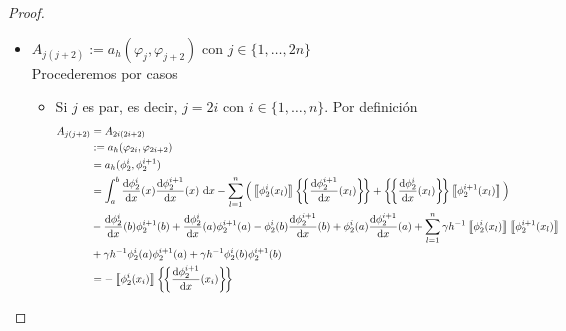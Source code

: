 \documentclass[10pt,a4paper]{report}
\newcommand{\dx}{\textup{d}x}
\providecommand{\Dx}[1]{\frac{\textup{d} #1}{\textup{d}x}}
\providecommand{\salto}[1]{\left\llbracket#1\right\rrbracket}
\providecommand{\prom}[1]{\left \{\!\left \{#1\right \}\!\right \}}
\begin{document}
\begin{proof}
\begin{itemize}
\begin{itemize}
\begin{align*}
            		           &-\Dx{\phi^{i}_{1}}(b)\phi^{i}_{2}(b) + \Dx{\phi^{i}_{1}}(a)\phi^{i}_{2}(a) - \phi^{i}_{1}(b)\Dx{\phi^{i}_{2}}(b) + \phi^{i}_{1}(a)\Dx{\phi^{i}_{2}}(a) + \sum_{l=1}^{n}\gamma h^{-1}\salto{\phi^{i}_{1}(x_{l})}\salto{\phi^{i}_{2}(x_{l})}\\
            		           &+ \gamma h^{-1}\phi^{i}_{1}(a)\phi^{i}_{2}(a) + \gamma h^{-1}\phi^{i}_{1}(b)\phi^{i}_{2}(b)\\
            		           &= \int_{x_{i-1}}^{x_{i}}-\frac{1}{h^{2}}\ \dx - \prom{\Dx{\phi^{i}_{1}}(x_{i})}\salto{\phi^{i}_{2}(x_{i})} - \salto{\phi^{i}_{1}(x_{i-1})}\prom{\Dx{\phi^{i}_{2}}(x_{i-1})}\\
            		           &= -\frac{1}{h} + \frac{1}{2h} + \frac{1}{2h}\\
            		           &= 0
            	\end{align*}
            \end{itemize}
            \item  $A_{j(j+2)} := a_{h}\left( \varphi_{j},\varphi_{j+2}\right)$ con $j\in\{1,\dots,2n\}$\\
            Procederemos por casos
            \begin{itemize}
            	\item Si $j$ es par, es decir, $j = 2i$ con $i\in\{1,\dots,n\}$. Por definición
            	\begin{align*}
            		A_{j(j+2)} &= A_{2i (2i+2)}\\ 
            		           &:= a_{h}(\varphi_{2i},\varphi_{2i+2})\\ 
            		           &= a_{h}(\phi^{i}_{2},\phi^{i+1}_{2})\\
            		           &= \int_{a}^{b} \Dx{\phi^{i}_{2}}(x)\Dx{\phi^{i+1}_{2}}(x)\ \dx - \sum_{l=1}^{n}\Big(\salto{\phi^{i}_{2}(x_{l})}\prom{\Dx{\phi^{i+1}_{2}}(x_{l})} + \prom{\Dx{\phi^{i}_{2}}(x_{l})}\salto{\phi^{i+1}_{2}(x_{l})}\Big)\\
            		           &-\Dx{\phi^{i}_{2}}(b)\phi^{i+1}_{2}(b) + \Dx{\phi^{i}_{2}}(a)\phi^{i+1}_{2}(a) - \phi^{i}_{2}(b)\Dx{\phi^{i+1}_{2}}(b) + \phi^{i}_{2}(a)\Dx{\phi^{i+1}_{2}}(a) + \sum_{l=1}^{n}\gamma h^{-1}\salto{\phi^{i}_{2}(x_{l})}\salto{\phi^{i+1}_{2}(x_{l})}\\
            		           &+ \gamma h^{-1}\phi^{i}_{2}(a)\phi^{i+1}_{2}(a) + \gamma h^{-1}\phi^{i}_{2}(b)\phi^{i+1}_{2}(b)\\
            		           &= -\salto{\phi^{i}_{2}(x_{i})}\prom{\Dx{\phi^{i+1}_{2}}(x_{i})} \\

\end{align*}
\end{itemize}
\end{itemize}
\end{proof}
\end{document}
